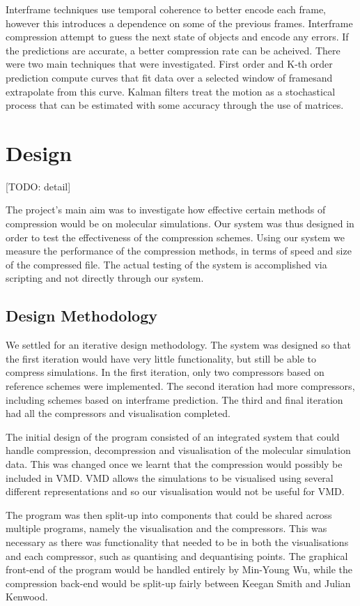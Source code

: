 \documentclass[a4paper,11pt]{report}
\begin{document}
Interframe techniques use temporal coherence to better encode each frame, however this introduces a dependence on some of the previous frames. Interframe compression attempt to guess the next state of objects and encode any errors. If the predictions are accurate, a better compression rate can be acheived. There were two main techniques that were investigated. First order and K-th order prediction compute curves that fit data over a selected window of framesand extrapolate from this curve. Kalman filters treat the motion as a stochastical process that can be estimated with some accuracy through the use of matrices.

\chapter{Design}

[TODO: detail]

The project's main aim was to investigate how effective certain methods of compression would be on molecular simulations. Our system was thus designed in order to test the effectiveness of the compression schemes. Using our system we measure the performance of the compression methods, in terms of speed and size of the compressed file. The actual testing of the system is accomplished via scripting and not directly through our system.

\section{Design Methodology}

We settled for an iterative design methodology. The system was designed so that the first iteration would have very little functionality, but still be able to compress simulations. In the first iteration, only two compressors based on reference schemes were implemented. The second iteration had more compressors, including schemes based on interframe prediction. The third and final iteration had all the compressors and visualisation completed.

The initial design of the program consisted of an integrated system that could handle compression, decompression and visualisation of the molecular simulation data. This was changed once we learnt that the compression would possibly be included in VMD. VMD allows the simulations to be visualised using several different representations and so our visualisation would not be useful for VMD.

The program was then split-up into components that could be shared across multiple programs, namely the visualisation and the compressors. This was necessary as there was functionality that needed to be in both the visualisations and each compressor, such as quantising and dequantising points. The graphical front-end of the program would be handled entirely by Min-Young Wu, while the compression back-end would be split-up fairly between Keegan Smith and Julian Kenwood. 
\end{document}
